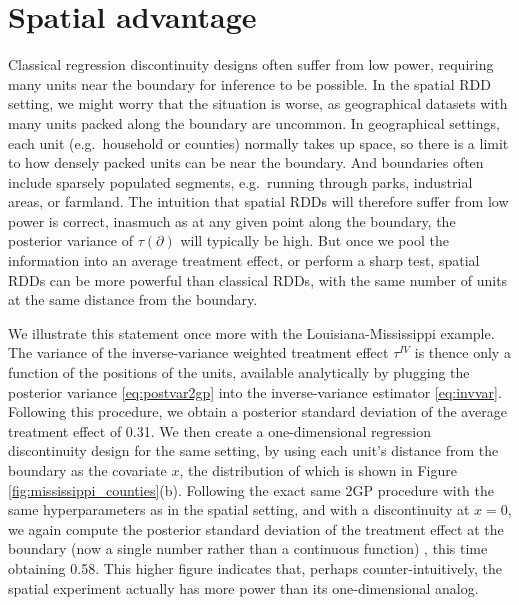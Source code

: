 \documentclass[letter]{article}
\newcommand{\boundary}{\partial}
\newcommand{\invvar}{\tau^{IV}}
\begin{document}
    	\section{Spatial advantage}\label{spatial-advantage}

Classical regression discontinuity designs often suffer from low power,
requiring many units near the boundary for inference to be possible. In
the spatial RDD setting, we might worry that the situation is worse, as
geographical datasets with many units packed along the boundary are
uncommon. In geographical settings, each unit (e.g.~household or
counties) normally takes up space, so there is a limit to how densely
packed units can be near the boundary. And boundaries often include
sparsely populated segments, e.g.~running through parks, industrial
areas, or farmland. The intuition that spatial RDDs will therefore
suffer from low power is correct, inasmuch as at any given point along
the boundary, the posterior variance of \(\tau(\boundary)\) will
typically be high. But once we pool the information into an average
treatment effect, or perform a sharp test, spatial RDDs can be more
powerful than classical RDDs, with the same number of units at the same
distance from the boundary.

We illustrate this statement once more with the Louisiana-Mississippi
example. The variance of the inverse-variance weighted treatment effect
\(\invvar\) is thence only a function of the positions of the units,
available analytically by plugging the posterior variance
\eqref{eq:postvar2gp} into the inverse-variance estimator
\eqref{eq:invvar}. Following this procedure, we obtain a posterior
standard deviation of the average treatment effect of 0.31. We then
create a one-dimensional regression discontinuity design for the same
setting, by using each unit's distance from the boundary as the
covariate \(x\), the distribution of which is shown in Figure
\ref{fig:mississippi_counties}(b). Following the exact same 2GP
procedure with the same hyperparameters as in the spatial setting, and
with a discontinuity at \(x=0\), we again compute the posterior standard
deviation of the treatment effect at the boundary (now a single number
rather than a continuous function) , this time obtaining 0.58. This
higher figure indicates that, perhaps counter-intuitively, the spatial
experiment actually has more power than its one-dimensional analog.
\end{document}
